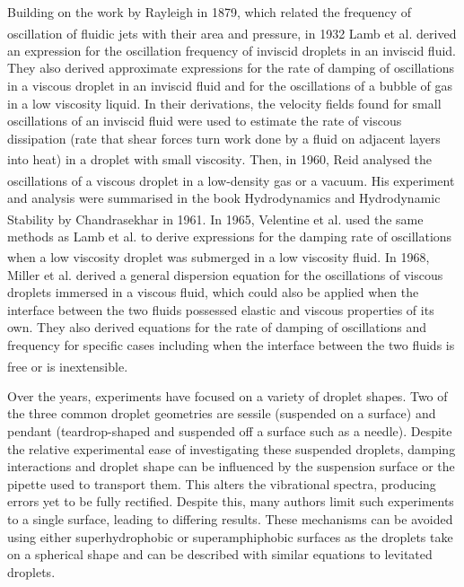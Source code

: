 \documentclass{physics_article_B}
\begin{document}
    Building on the work by Rayleigh in 1879, which related the frequency of oscillation of fluidic jets with their area and pressure\textsuperscript{\cite{rayleigh}}, in 1932 Lamb et al. derived an expression for the oscillation frequency of inviscid droplets in an inviscid fluid. They also derived approximate expressions for the rate of damping of oscillations in a viscous droplet in an inviscid fluid and for the oscillations of a bubble of gas in a low viscosity liquid. In their derivations, the velocity fields found for small oscillations of an inviscid fluid were used to estimate the rate of viscous dissipation (rate that shear forces turn work done by a fluid on adjacent layers into heat) in a droplet with small viscosity\textsuperscript{\cite{lamb}}. Then, in 1960, Reid analysed the oscillations of a viscous droplet in a low-density gas or a vacuum\textsuperscript{\cite{reid}}. His experiment and analysis were summarised in the book Hydrodynamics and Hydrodynamic Stability by Chandrasekhar in 1961\textsuperscript{\cite{chandrasekhar}}. In 1965, Velentine et al. used the same methods as Lamb et al. to derive expressions for the damping rate of oscillations when a low viscosity droplet was submerged in a low viscosity fluid\textsuperscript{\cite{velentine}}. In 1968, Miller et al. derived a general dispersion equation for the oscillations of viscous droplets immersed in a viscous fluid, which could also be applied when the interface between the two fluids possessed elastic and viscous properties of its own. They also derived equations for the rate of damping of oscillations and frequency for specific cases including when the interface between the two fluids is free or is inextensible\textsuperscript{\cite{miller}}.
    
    
    Over the years, experiments have focused on a variety of droplet shapes. Two of the three common droplet geometries are sessile (suspended on a surface)\cite{Temperton2012, vukasinovic, Backholm2017} and pendant (teardrop-shaped and suspended off a surface such as a needle)\cite{Temperton2012}. Despite the relative experimental ease of investigating these suspended droplets, damping interactions and droplet shape can be influenced by the suspension surface or the pipette used to transport them\cite{Sharp2011}. This alters the vibrational spectra, producing errors yet to be fully rectified\cite{harrold}. Despite this, many authors limit such experiments to a single surface\cite{Sharp2011}, leading to differing results. These mechanisms can be avoided using either superhydrophobic or superamphiphobic surfaces as the droplets take on a spherical shape and can be described with similar equations to levitated droplets.
    
\end{document}
